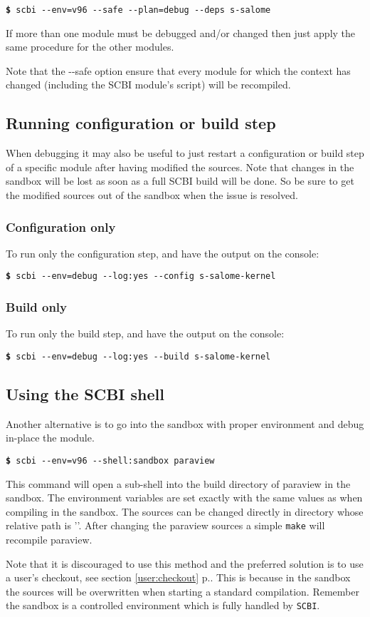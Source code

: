 \documentclass[a4paper,12pt,twoside]{article}
\newcommand{\code}[1]{\texttt{#1}}
\newcommand{\seeref}[1]{see section \ref{#1} p.\pageref{#1}}
\newcommand{\file}[1]{'{\path{#1}}'}
\newcommand{\cmd}[1]{\tabto{1cm}\hspace{0.5cm}\texttt{\textbf{\$} #1}}
\newcommand{\ddash}{-{}-}
\begin{document}
\cmd{scbi \ddash{}env=v96 \ddash{}safe \ddash{}plan=debug \ddash{}deps s-salome}

If more than one module must be debugged and/or changed then just apply the same procedure for the other modules.

Note that the \ddash{}safe option ensure that every module for which the context has changed (including the SCBI module's script) will be recompiled.

\subsection{Running configuration or build step}

When debugging it may also be useful to just restart a configuration or build step of a specific module after having modified the sources. Note that changes in the sandbox will be lost as soon as a full SCBI build will be done. So be sure to get the modified sources out of the sandbox when the issue is resolved.

\subsubsection{Configuration only}

To run only the configuration step, and have the output on the console:

\cmd{scbi \ddash{}env=debug \ddash{}log:yes \ddash{}config s-salome-kernel}

\subsubsection{Build only}

To run only the build step, and have the output on the console:

\cmd{scbi \ddash{}env=debug \ddash{}log:yes \ddash{}build s-salome-kernel}

\subsection{Using the SCBI shell}

Another alternative is to go into the sandbox with proper environment and debug in-place the module.

\cmd{scbi \ddash{}env=v96 \ddash{}shell:sandbox paraview}

This command will open a sub-shell into the build directory of paraview in the sandbox. The environment variables are set exactly with the same values as when compiling in the sandbox. The sources can be changed directly in directory whose relative path is \file{../src}. After changing the paraview sources a simple \code{make} will recompile paraview.

Note that it is discouraged to use this method and the preferred solution is to use a user's checkout, \seeref{user:checkout}. This is because in the sandbox the sources will be overwritten when starting a standard compilation. Remember the sandbox is a controlled environment which is fully handled by \code{SCBI}.

\printindex

\end{document}
